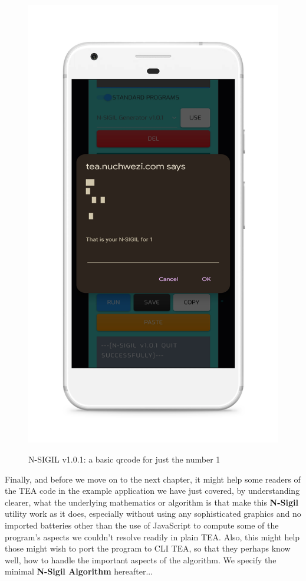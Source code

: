 \documentclass[a4paper, 18pt]{book} %
\begin{document}
    \begin{figure}[H]
      \centering
      \includegraphics[height=0.6\textheight,]{resources/images/nsigil_qrcode.png}\\
        \caption{N-SIGIL v1.0.1: a basic qrcode for just the number 1}
      \label{FIGNSIGIL3}
    \end{figure}
    
    
  Finally, and before we move on to the next chapter, it might help some readers of the TEA code in the example application we have just covered, by understanding clearer, what the underlying mathematics or algorithm is that make this \textbf{N-Sigil} utility work as it does, especially without using any sophisticated graphics and no imported batteries other than the use of JavaScript to compute some of the program's aspects we couldn't resolve readily in plain TEA. Also, this might help those might wish to port the program to CLI TEA, so that they perhaps know well, how to handle the important aspects of the algorithm. We specify the minimal \textbf{N-Sigil Algorithm} hereafter...
  
\end{document}
